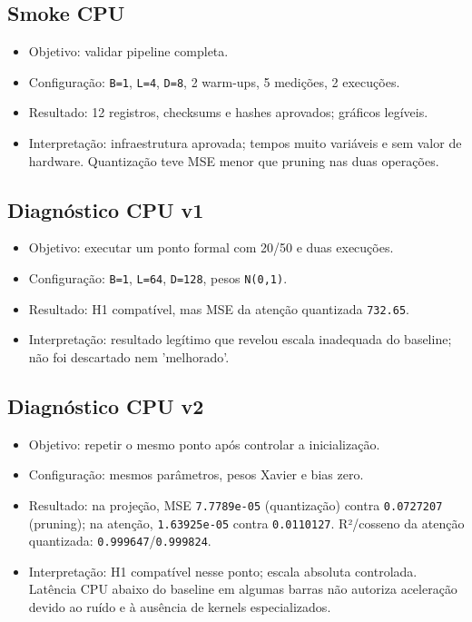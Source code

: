 \subsection{Smoke CPU}


\begin{itemize}
\item Objetivo: validar pipeline completa.
\item Configuração: \texttt{B=1}, \texttt{L=4}, \texttt{D=8}, 2 warm-ups, 5 medições, 2 execuções.
\item Resultado: 12 registros, checksums e hashes aprovados; gráficos legíveis.
\item Interpretação: infraestrutura aprovada; tempos muito variáveis e sem valor de
hardware. Quantização teve MSE menor que pruning nas duas operações.
\end{itemize}


\subsection{Diagnóstico CPU v1}


\begin{itemize}
\item Objetivo: executar um ponto formal com 20/50 e duas execuções.
\item Configuração: \texttt{B=1}, \texttt{L=64}, \texttt{D=128}, pesos \texttt{N(0,1)}.
\item Resultado: H1 compatível, mas MSE da atenção quantizada \texttt{732.\allowbreak{}65}.
\item Interpretação: resultado legítimo que revelou escala inadequada do baseline;
não foi descartado nem 'melhorado'.
\end{itemize}


\subsection{Diagnóstico CPU v2}


\begin{itemize}
\item Objetivo: repetir o mesmo ponto após controlar a inicialização.
\item Configuração: mesmos parâmetros, pesos Xavier e bias zero.
\item Resultado: na projeção, MSE \texttt{7.\allowbreak{}7789e-05} (quantização) contra \texttt{0.\allowbreak{}0727207}
(pruning); na atenção, \texttt{1.\allowbreak{}63925e-05} contra \texttt{0.\allowbreak{}0110127}. R²/cosseno da atenção
quantizada: \texttt{0.\allowbreak{}999647}/\texttt{0.\allowbreak{}999824}.
\item Interpretação: H1 compatível nesse ponto; escala absoluta controlada. Latência
CPU abaixo do baseline em algumas barras não autoriza aceleração devido ao
ruído e à ausência de kernels especializados.
\end{itemize}


